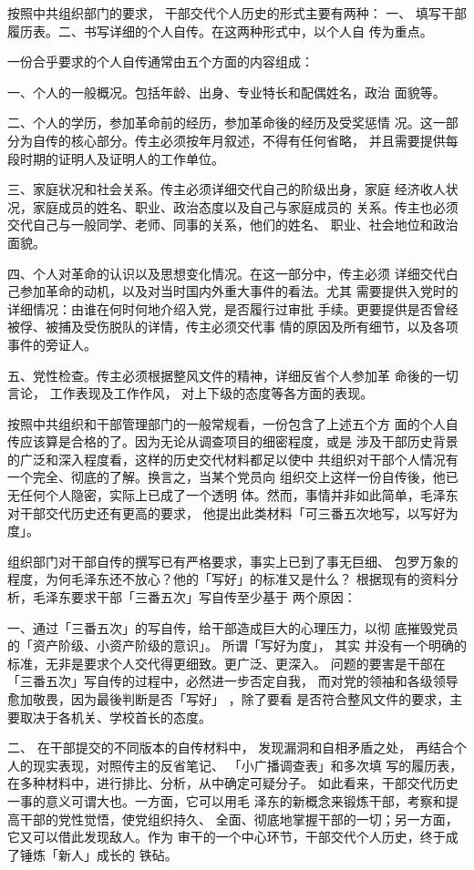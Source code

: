 按照中共组织部门的要求，
干部交代个人历史的形式主要有两种：
一、
填写干部履历表。二、书写详细的个人自传。在这两种形式中，以个人自
传为重点。

一份合乎要求的个人自传通常由五个方面的内容组成：

一、个人的一般概况。包括年龄、出身、专业特长和配偶姓名，政治
面貌等。

二、个人的学历，参加革命前的经历，参加革命後的经历及受奖惩情
况。这一部分为自传的核心部分。传主必须按年月叙述，不得有任何省略，
并且需要提供每段时期的证明人及证明人的工作单位。

三、家庭状况和社会关系。传主必须详细交代自己的阶级出身，家庭
经济收人状况，家庭成员的姓名、职业、政治态度以及自己与家庭成员的
关系。传主也必须交代自己与一般同学、老师、同事的关系，他们的姓名、
职业、社会地位和政治面貌。

四、个人对革命的认识以及思想变化情况。在这一部分中，传主必须
详细交代白己参加革命的动机，以及对当时国内外重大事件的看法。尤其
需要提供入党时的详细情况：由谁在何时何地介绍入党，是否履行过审批
手续。更要提供是否曾经被俘、被捕及受伤脱队的详情，传主必须交代事
情的原因及所有细节，以及各项事件的旁证人。

五、党性检查。传主必须根据整风文件的精神，详细反省个人参加革
命後的一切言论，
工作表现及工作作风，
对上下级的态度等各方面的表现。

按照中共组织和干部管理部门的一般常规看，一份包含了上述五个方
面的个人自传应该算是合格的了。因为无论从调查项目的细密程度，或是
涉及干部历史背景的广泛和深入程度看，这样的历史交代材料都足以使中
共组织对干部个人情况有一个完全、彻底的了解。换言之，当某个党员向
组织交上这样一份自传後，他已无任何个人隐密，实际上已成了一个透明
体。然而，事情并非如此简单，毛泽东对干部交代历史还有更高的要求，
他提出此类材料「可三番五次地写，以写好为度」。

组织部门对干部自传的撰写已有严格要求，事实上已到了事无巨细、
包罗万象的程度，为何毛泽东还不放心？他的「写好」的标准又是什么？
根据现有的资料分析，毛泽东要求干部「三番五次」写自传至少基于
两个原因：

一、通过「三番五次」的写自传，给干部造成巨大的心理压力，以彻
底摧毁党员的「资产阶级、小资产阶级的意识」。
所谓「写好为度」，
其实
并没有一个明确的标准，无非是要求个人交代得更细致。更广泛、更深入。
问题的要害是干部在「三番五次」写自传的过程中，必然进一步否定自我，
而对党的领袖和各级领导愈加敬畏，因为最後判断是否「写好」
，除了要看
是否符合整风文件的要求，主要取决于各机关、学校首长的态度。

二、
在干部提交的不同版本的自传材料中，
发现漏洞和自相矛盾之处，
再结合个人的现实表现，对照传主的反省笔记、
「小广播调查表」和多次填
写的履历表，在多种材料中，进行排比、分析，从中确定可疑分子。
如此看来，干部交代历史一事的意义可谓大也。一方面，它可以用毛
泽东的新概念来锻炼干部，考察和提高干部的党性觉悟，使党组织持久、
全面、彻底地掌握干部的一切；另一方面，它又可以借此发现敌人。作为
审干的一个中心环节，干部交代个人历史，终于成了锤炼「新人」成长的
铁砧。

